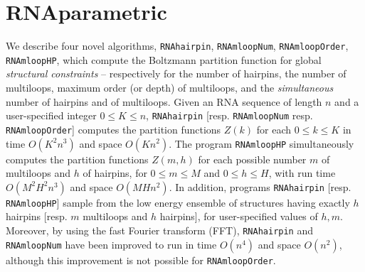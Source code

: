 
\newcommand{\ob}{\,\mbox{\bf\texttt{[}}\,}
\newcommand{\cb}{\,\mbox{\bf\texttt{]}}\,}
\newcommand{\unafold}{\mbox{\tt UNAFold}\xspace}
\newcommand{\mfold}{\mbox{\tt mfold}\xspace}
\newcommand{\rnahairpinml}{\mbox{\tt RNAmloopHP}\xspace}
\newcommand{\rnamloop}{\mbox{\tt RNAmloop}\xspace}
\newcommand{\rnamlnumber}{\mbox{\tt RNAmloopNum}\xspace}
\newcommand{\rnamlorder}{\mbox{\tt RNAmloopOrder}\xspace}
\newcommand{\rnahairpin}{\mbox{\tt RNAhairpin}\xspace}
\newcommand{\rnaz}{\mbox{\tt RNAz}\xspace}

\chapter{RNAparametric} %

\label{RNAparametric} %


We describe four novel algorithms,
{\rnahairpin}, {\rnamlnumber}, {\rnamlorder}, {\rnahairpinml},
which compute
the Boltzmann partition function for global {\em structural constraints} --
respectively for the number of hairpins, the number of multiloops,
maximum order (or depth) of multiloops, and the {\em simultaneous}
number of hairpins and of multiloops.  Given an RNA sequence of length $n$
and a user-specified integer $0 \leq K \leq n$,
{\rnahairpin} [resp. {\rnamlnumber} resp. {\rnamlorder}] computes
the partition functions $Z(k)$ for each $0 \leq k \leq K$ in
time $O(K^2 n^3)$ and space $O(K n^2)$. The program {\rnahairpinml}
simultaneously computes the partition functions $Z(m,h)$ for each
possible number $m$ of multiloops and $h$ of hairpins, for
$0 \leq m \leq M$ and $0 \leq h \leq H$, with run time
$O(M^2 H^2 n^3)$ and space $O(MH n^2)$. In addition, programs
{\rnahairpin} [resp. {\rnahairpinml}] sample from the low energy
ensemble of structures having exactly $h$ hairpins [resp. $m$ multiloops
and $h$ hairpins], for user-specified values of $h,m$.
Moreover, by using the fast Fourier transform (FFT),
{\rnahairpin} and {\rnamlnumber} have been improved to run in
time $O(n^4)$ and space $O(n^2)$, although this improvement is not possible
for {\rnamlorder}.

